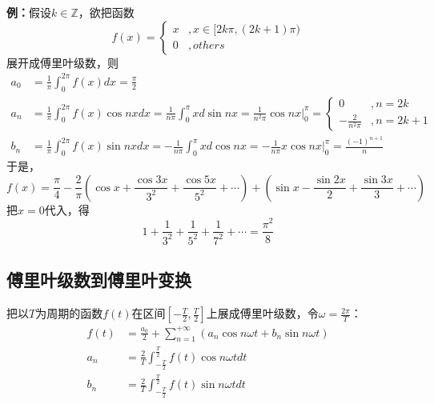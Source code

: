 	\noindent\textbf{例：}假设$k\in \mathbb{Z}$，欲把函数
	\begin{equation*}
		f(x)=
		\begin{cases}
		x&, x\in [2k\pi,(2k+1)\pi)	\\
		0&, others
	\end{cases}
	\end{equation*}
	展开成傅里叶级数，则
	\begin{equation*}
	\begin{aligned}
		a_0 
		&= \frac{1}{\pi}\int_0^{2\pi}f(x)dx=\frac{\pi}{2}	\\
		a_n 
		&= \frac{1}{\pi}\int_0^{2\pi}f(x)\cos nxdx	= \frac{1}{n\pi}\int_0^{\pi}xd\sin nx = \frac{1}{n^2\pi}\cos nx|_0^{\pi} =
		\begin{cases}
		0	&,n=2k	\\
		-\frac{2}{n^2\pi} &,n=2k+1
		\end{cases}	\\
		b_n 
		&= \frac{1}{\pi}\int_0^{2\pi}f(x)\sin nxdx = -\frac{1}{n\pi}\int_0^{\pi}xd\cos nx = -\frac{1}{n\pi}x\cos nx|_0^{\pi} = \frac{(-1)^{n+1}}{n}
	\end{aligned}
	\end{equation*}
	于是，
	$$
		f(x) = \frac{\pi}{4}-\frac{2}{\pi}(\cos x + \frac{\cos 3x}{3^2} + \frac{\cos 5x}{5^2}+\cdots) + (\sin x - \frac{\sin 2x}{2} + \frac{\sin 3x}{3} + \cdots)
	$$
	把$x=0$代入，得
	$$
		1 + \frac{1}{3^2} + \frac{1}{5^2} + \frac{1}{7^2} + \cdots = \frac{\pi^2}{8}
	$$

\subsection{傅里叶级数到傅里叶变换}
	把以$T$为周期的函数$f(t)$在区间$[-\frac{T}{2},\frac{T}{2}]$上展成傅里叶级数，令$\omega=\frac{2\pi}{T}$：
	\begin{equation}
	\label{Fourier_T}
	\begin{aligned}
		f(t)
		&=\frac{a_0}{2}+\sum_{n=1}^{+\infty}(a_n\cos n\omega t + b_n\sin n\omega t)	\\
		a_n
		&=\frac{2}{T}\int_{-\frac{T}{2}}^{\frac{T}{2}}f(t)\cos n\omega tdt	\\
		b_n
		&=\frac{2}{T}\int_{-\frac{T}{2}}^{\frac{T}{2}}f(t)\sin n\omega tdt
	\end{aligned}
	\end{equation}
	
